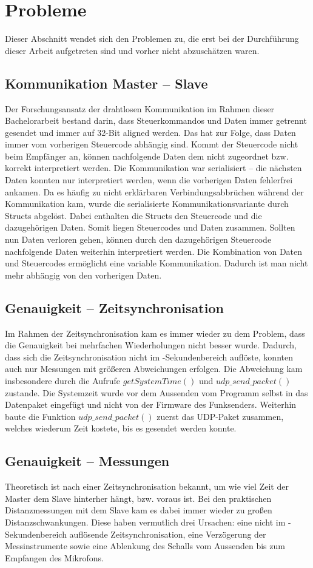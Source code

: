 \newpage
\section{Probleme}
Dieser Abschnitt wendet sich den Problemen zu, die erst bei der Durchführung dieser Arbeit aufgetreten sind und vorher nicht abzuschätzen waren.

\subsection{Kommunikation Master -- Slave}
Der Forschungsansatz der drahtlosen Kommunikation im Rahmen dieser Bachelorarbeit bestand darin, dass Steuerkommandos und Daten immer getrennt gesendet und immer auf 32-Bit aligned werden. Das hat zur Folge, dass Daten immer vom vorherigen Steuercode abhängig sind. Kommt der Steuercode nicht beim Empfänger an, können nachfolgende Daten dem nicht zugeordnet bzw. korrekt interpretiert werden. Die Kommunikation war serialisiert -- die nächsten Daten konnten nur interpretiert werden, wenn die vorherigen Daten fehlerfrei ankamen. Da es häufig zu nicht erklärbaren Verbindungsabbrüchen während der Kommunikation kam, wurde die serialisierte Kommunikationsvariante durch Structs abgelöst. Dabei enthalten die Structs den Steuercode und die dazugehörigen Daten. Somit liegen Steuercodes und Daten zusammen. Sollten nun Daten verloren gehen, können durch den dazugehörigen Steuercode nachfolgende Daten weiterhin interpretiert werden. Die Kombination von Daten und Steuercodes ermöglicht eine variable Kommunikation. Dadurch ist man nicht mehr abhängig von den vorherigen Daten.

\subsection{Genauigkeit -- Zeitsynchronisation}
Im Rahmen der Zeitsynchronisation kam es immer wieder zu dem Problem, dass die Genauigkeit bei mehrfachen Wiederholungen nicht besser wurde. Dadurch, dass sich die Zeitsynchronisation nicht im \si{\mu}-Sekundenbereich auflöste, konnten auch nur Messungen mit größeren Abweichungen erfolgen. Die Abweichung kam insbesondere durch die Aufrufe $getSystemTime()$ und $udp\_send\_packet()$ zustande. Die Systemzeit wurde vor dem Aussenden vom Programm selbst in das Datenpaket eingefügt und nicht von der Firmware des Funksenders. Weiterhin baute die Funktion $udp\_send\_packet()$ zuerst das UDP-Paket zusammen, welches wiederum Zeit kostete, bis es gesendet werden konnte.

\subsection{Genauigkeit -- Messungen}
Theoretisch ist nach einer Zeitsynchronisation bekannt, um wie viel Zeit der Master dem Slave hinterher hängt, bzw. voraus ist. Bei den praktischen Distanzmessungen mit dem Slave kam es dabei immer wieder zu großen Distanzschwankungen. Diese haben vermutlich drei Ursachen: eine nicht im \si{\mu}-Sekundenbereich auflösende Zeitsynchronisation, eine Verzögerung der Messinstrumente sowie eine Ablenkung des Schalls vom Aussenden bis zum Empfangen des Mikrofons.